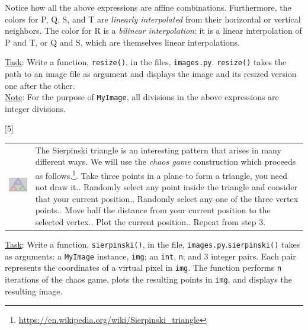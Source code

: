 \documentclass[addpoints]{exam}
\begin{document}
\begin{questions}
  Notice how all the above expressions are affine combinations. Furthermore, the colors for P, Q, S, and T are \textit{linearly interpolated} from their horizontal or vertical neighbors. The color for R is a \textit{bilinear interpolation}: it is a linear interpolation of P and T, or Q and S, which are themselves linear interpolations.

  \underline{Task}: Write a function, \texttt{resize()}, in the files, \texttt{images.py}. \texttt{resize()} takes the path to an image file as argument and displays the image and its resized version one after the other.\\
  \underline{Note}: For the purpose of \texttt{MyImage}, all divisions in the above expressions are integer divisions.
  
  
[5]

  \begin{tabularx}{\linewidth}{cX}
    \includegraphics[scale=0.75, align=t]{sierpinski1}
    & The Sierpinski triangle is an interesting pattern that arises in many different ways. We will use the \textit{chaos game} construction which proceeds as follows.\footnote{\url{https://en.wikipedia.org/wiki/Sierpinski_triangle}}\newline
    1. Take three points in a plane to form a triangle, you need not draw it.\newline
    2. Randomly select any point inside the triangle and consider that your current position.\newline
    3. Randomly select any one of the three vertex points.\newline
    4. Move half the distance from your current position to the selected vertex.\newline
    5. Plot the current position.\newline
    6. Repeat from step 3.
  \end{tabularx}

  \underline{Task}: Write a function, \texttt{sierpinski()}, in the file, \texttt{images.py}.\texttt{sierpinski()} takes as arguments: a \texttt{MyImage} instance, \texttt{img}; an \texttt{int}, \texttt{n}; and 3 integer pairs. Each pair represents the coordinates of a virtual pixel in \texttt{img}. The function performs \texttt{n} iterations of the chaos game, plots the resulting points in \texttt{img}, and displays the resulting image.


\end{questions}
\end{document}
